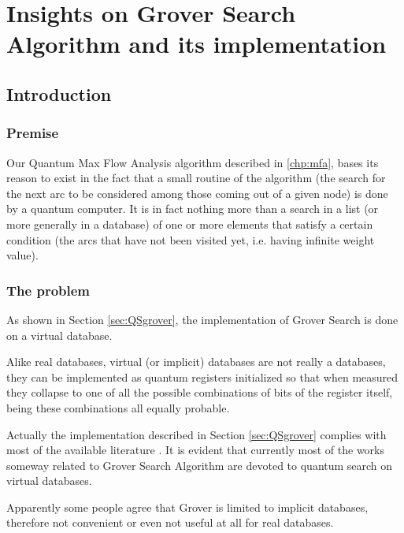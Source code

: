
\chapter{Insights on Grover Search Algorithm and its implementation}
\label{chp:grover}

\section{Introduction}

\subsection{Premise}

Our Quantum Max Flow Analysis algorithm described in \ref{chp:mfa}, bases its reason to exist in the fact that a small routine of the algorithm (the search for the next arc to be considered among those coming out of a given node) is done by a quantum computer. It is in fact nothing more than a search in a list (or more generally in a database) of one or more elements that satisfy a certain condition (the arcs that have not been visited yet, i.e. having infinite weight value).

\subsection{The problem}

As shown in Section \ref{sec:QSgrover}, the implementation of Grover Search is done on a virtual database.

Alike real databases, virtual (or implicit) databases are not really a databases, they can be implemented as quantum registers initialized so that when measured they collapse to one of all the possible combinations of bits of the register itself, being these combinations all equally probable.

Actually the implementation described in Section \ref{sec:QSgrover} complies with most of the available literature \cite{Grover:1996:FQM:237814.237866, lavor2003grover}. It is evident that currently most of the works someway related to Grover Search Algorithm are devoted to quantum search on virtual databases. \cite{Broda2016}

\bigskip

Apparently some people agree that Grover is limited to implicit databases, therefore not convenient or even not useful at all for real databases. \cite{1425397, Zalka2000, stackexchange1, stackexchange2, stackexchange3}

